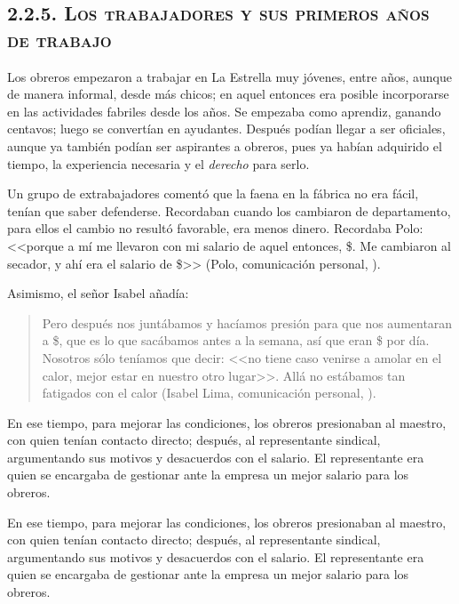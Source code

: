 \documentclass[14pt,letterpaper,twoside]{extbook} %
\begin{document}
\subsection*{\mdseries\large\textsc{2.2.5. Los trabajadores y sus primeros años de trabajo}}

\noindent Los obreros empezaron a trabajar en La Estrella muy jóvenes, entre  años, aunque de manera informal, desde más chicos; en aquel entonces era posible incorporarse en las actividades fabriles desde los  años. Se empezaba como aprendiz, ganando  centavos; luego se convertían en ayudantes. Después podían llegar a ser oficiales, aunque ya también podían ser aspirantes a obreros, pues ya habían adquirido el tiempo, la experiencia necesaria y el \textit{derecho} para serlo.

Un grupo de extrabajadores comentó que la faena en la fábrica no era fácil, tenían que saber defenderse. Recordaban cuando los cambiaron de departamento, para ellos el cambio no resultó favorable, era menos dinero. Recordaba Polo: <<porque a mí me llevaron con mi salario de aquel entonces, \$. Me cambiaron al secador, y ahí era el salario de \$>> (Polo, comunicación personal, ).

Asimismo, el señor Isabel añadía:

\begin{quotation}
\noindent Pero después nos juntábamos y hacíamos presión para que nos aumentaran a \$, que es lo que sacábamos antes a la semana, así que eran \$ por día. Nosotros sólo teníamos que decir: <<no tiene caso venirse a amolar en el calor, mejor estar en nuestro otro lugar>>. Allá no estábamos tan fatigados con el calor (Isabel Lima, comunicación personal, ).
\end{quotation}

\noindent En ese tiempo, para mejorar las condiciones, los obreros presionaban al maestro, con quien tenían contacto directo; después, al representante sindical, argumentando sus motivos y desacuerdos con el salario. El representante era quien se encargaba de gestionar ante la empresa un mejor salario para los obreros.

En ese tiempo, para mejorar las condiciones, los obreros presionaban al maestro, con quien tenían contacto directo; después, al representante sindical, argumentando sus motivos y desacuerdos con el salario. El representante era quien se encargaba de gestionar ante la empresa un mejor salario para los obreros.
\end{document}

